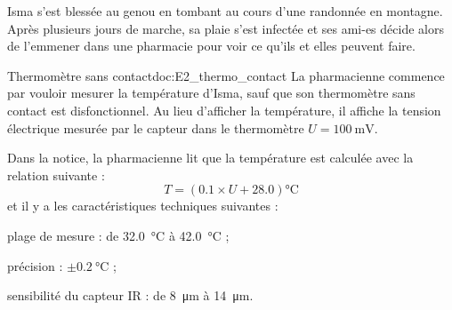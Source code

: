 \tetePremStssRedo

\nomPrenomClasse






\begin{contexte}  
  Isma s'est blessée au genou en tombant au cours d'une randonnée en montagne.
  Après plusieurs jours de marche, sa plaie s'est infectée et ses ami-es décide alors de l'emmener dans une pharmacie pour voir ce qu'ils et elles peuvent faire.
\end{contexte}
\vspace*{-8pt}



\begin{doc}{Thermomètre sans contact}{doc:E2_thermo_contact}
  La pharmacienne commence par vouloir mesurer la température d'Isma, sauf que son thermomètre sans contact est disfonctionnel.
  Au lieu d'afficher la température, il affiche la tension électrique mesurée par le capteur dans le thermomètre $U = \qty{100}{\milli\volt}$.
  
  Dans la notice, la pharmacienne lit que la température est calculée avec la relation suivante : 
  \begin{equation*}
    T = (\num{0,1}\times U + \num{28,0}) \unit{\degreeCelsius}
  \end{equation*}
  et il y a les caractéristiques techniques suivantes :
    \begin{listePoints}
      \item plage de mesure : de \qty{32,0}{\degreeCelsius} à \qty{42,0}{\degreeCelsius} ;
      \item précision : $\pm \qty{0,2}{\degreeCelsius}$ ;
      \item sensibilité du capteur IR : de \qty{8}{\micro\m} à \qty{14}{\micro\m}.
    \end{listePoints}
\end{doc}

